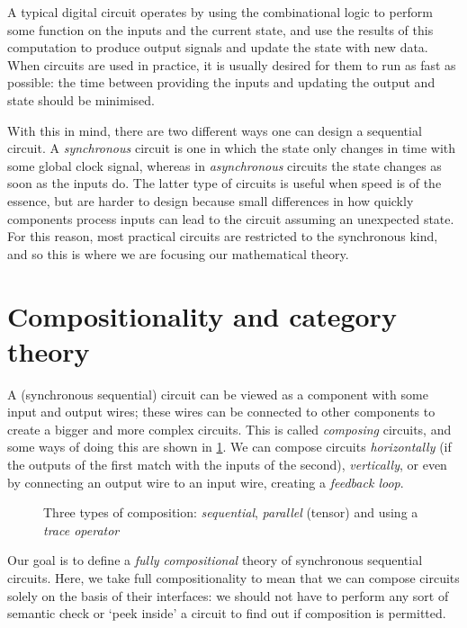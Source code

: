 A typical digital circuit operates by using the combinational logic to perform
some function on the inputs and the current state, and use the results of this
computation to produce output signals and update the state with new data.
When circuits are used in practice, it is usually desired for them to run as
fast as possible: the time between providing the inputs and updating the
output and state should be minimised.

With this in mind, there are two different ways one can design a sequential
circuit.
A \emph{synchronous} circuit is one in which the state only changes in time with
some global clock signal, whereas in \emph{asynchronous} circuits the state
changes as soon as the inputs do.
The latter type of circuits is useful when speed is of the essence, but are
harder to design because small differences in how quickly components process
inputs can lead to the circuit assuming an unexpected state.
For this reason, most practical circuits are restricted to the synchronous
kind, and so this is where we are focusing our mathematical theory.

\section{Compositionality and category theory}

A (synchronous sequential) circuit can be viewed as a component with some
input and output wires; these wires can be connected to other components to
create a bigger and more complex circuits.
This is called \emph{composing} circuits, and some ways of doing this are
shown in \cref{fig:composition}.
We can compose circuits \emph{horizontally} (if the outputs of the first match
with the inputs of the second), \emph{vertically}, or even by connecting an
output wire to an input wire, creating a \emph{feedback loop}.

\begin{figure}
    \centering
    \qquad
    \qquad
    \caption{
        Three types of composition: \emph{sequential}, \emph{parallel} (tensor)
        and using a \emph{trace operator}
    }
    \label{fig:composition}
\end{figure}

Our goal is to define a \emph{fully compositional} theory of synchronous
sequential circuits.
Here, we take full compositionality to mean that we can compose circuits solely
on the basis of their interfaces: we should not have to perform any sort of
semantic check or `peek inside' a circuit to find out if composition is
permitted.

